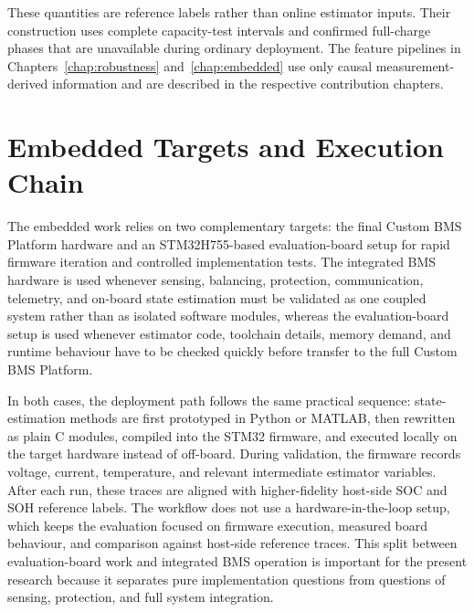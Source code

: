 \documentclass[
    a4paper,
    12pt,
    titlepage,
    bibliography=totoc,
    twoside=on,
    parskip=false,
    numbers=noenddot,
    cleardoublepage=empty,
    DIV=12,
    BCOR=12.0mm,
    headheight=36pt,
    headings=openright
]{scrreprt}
\begin{document}
These quantities are reference labels rather than online estimator inputs. Their construction uses complete capacity-test intervals and confirmed full-charge phases that are unavailable during ordinary deployment. The feature pipelines in Chapters~\ref{chap:robustness} and~\ref{chap:embedded} use only causal measurement-derived information and are described in the respective contribution chapters.

\section{Embedded Targets and Execution Chain}
The embedded work relies on two complementary targets: the final Custom BMS Platform hardware and an STM32H755-based evaluation-board setup for rapid firmware iteration and controlled implementation tests. The integrated BMS hardware is used whenever sensing, balancing, protection, communication, telemetry, and on-board state estimation must be validated as one coupled system rather than as isolated software modules, whereas the evaluation-board setup is used whenever estimator code, toolchain details, memory demand, and runtime behaviour have to be checked quickly before transfer to the full Custom BMS Platform.

In both cases, the deployment path follows the same practical sequence: state-estimation methods are first prototyped in Python or MATLAB, then rewritten as plain C modules, compiled into the STM32 firmware, and executed locally on the target hardware instead of off-board. During validation, the firmware records voltage, current, temperature, and relevant intermediate estimator variables. After each run, these traces are aligned with higher-fidelity host-side SOC and SOH reference labels. The workflow does not use a hardware-in-the-loop setup, which keeps the evaluation focused on firmware execution, measured board behaviour, and comparison against host-side reference traces. This split between evaluation-board work and integrated BMS operation is important for the present research because it separates pure implementation questions from questions of sensing, protection, and full system integration.
\end{document}
